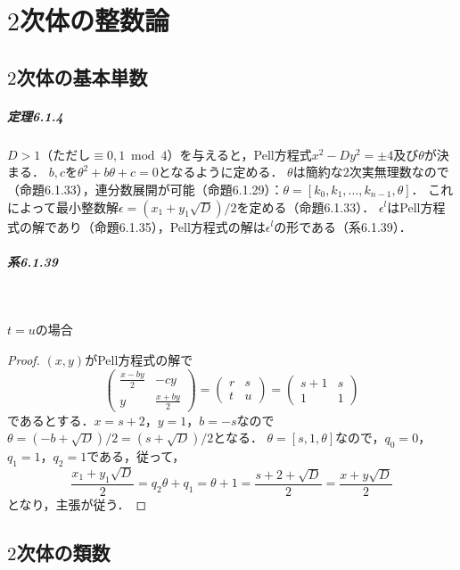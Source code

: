 \chapter{$2$次体の整数論}
\section{$2$次体の基本単数}
\paragraph{定理6.1.4}
$D>1$（ただし$\equiv 0, 1 \bmod 4$）を与えると，Pell方程式$x^2-Dy^2=\pm4$及び$\theta$が決まる．
$b,c$を$\theta^2+b\theta+c=0$となるように定める．
$\theta$は簡約な$2$次実無理数なので（命題6.1.33），連分数展開が可能（命題6.1.29）：$\theta=[k_0,k_1,\ldots,k_{n-1},\theta]$．
これによって最小整数解$\epsilon = (x_1 + y_1\sqrt{D})/2$を定める（命題6.1.33）．
$\epsilon^l$はPell方程式の解であり（命題6.1.35），Pell方程式の解は$\epsilon^l$の形である（系6.1.39）．

\paragraph{系6.1.39}~
\begin{screen}
  $t=u$の場合
\end{screen}
\begin{proof}
  $(x, y)$がPell方程式の解で
  \[
  \begin{pmatrix}
    \frac{x-by}{2} & -cy \\
    y & \frac{x+by}{2}
  \end{pmatrix}
  =
  \begin{pmatrix}
    r & s \\
    t & u
  \end{pmatrix}
  =
  \begin{pmatrix}
    s+1 & s \\
    1 & 1
  \end{pmatrix}
  \]
  であるとする．$x=s+2$，$y=1$，$b=-s$なので$\theta=(-b+\sqrt{D})/2=(s+\sqrt{D})/2$となる．
  $\theta=[s,1,\theta]$なので，$q_0=0$，$q_1=1$，$q_2=1$である，従って，
  \[\frac{x_1+y_1\sqrt{D}}{2} = q_2\theta + q_1 = \theta + 1 = \frac{s+2+\sqrt{D}}{2} = \frac{x+y\sqrt{D}}{2}\]
  となり，主張が従う．
\end{proof}

\section{$2$次体の類数}
